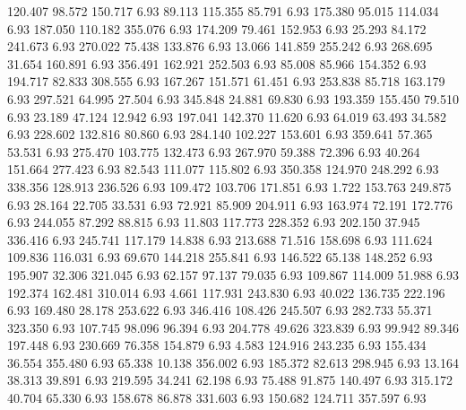  120.407   98.572  150.717         6.93
  89.113  115.355   85.791         6.93
 175.380   95.015  114.034         6.93
 187.050  110.182  355.076         6.93
 174.209   79.461  152.953         6.93
  25.293   84.172  241.673         6.93
 270.022   75.438  133.876         6.93
  13.066  141.859  255.242         6.93
 268.695   31.654  160.891         6.93
 356.491  162.921  252.503         6.93
  85.008   85.966  154.352         6.93
 194.717   82.833  308.555         6.93
 167.267  151.571   61.451         6.93
 253.838   85.718  163.179         6.93
 297.521   64.995   27.504         6.93
 345.848   24.881   69.830         6.93
 193.359  155.450   79.510         6.93
  23.189   47.124   12.942         6.93
 197.041  142.370   11.620         6.93
  64.019   63.493   34.582         6.93
 228.602  132.816   80.860         6.93
 284.140  102.227  153.601         6.93
 359.641   57.365   53.531         6.93
 275.470  103.775  132.473         6.93
 267.970   59.388   72.396         6.93
  40.264  151.664  277.423         6.93
  82.543  111.077  115.802         6.93
 350.358  124.970  248.292         6.93
 338.356  128.913  236.526         6.93
 109.472  103.706  171.851         6.93
   1.722  153.763  249.875         6.93
  28.164   22.705   33.531         6.93
  72.921   85.909  204.911         6.93
 163.974   72.191  172.776         6.93
 244.055   87.292   88.815         6.93
  11.803  117.773  228.352         6.93
 202.150   37.945  336.416         6.93
 245.741  117.179   14.838         6.93
 213.688   71.516  158.698         6.93
 111.624  109.836  116.031         6.93
  69.670  144.218  255.841         6.93
 146.522   65.138  148.252         6.93
 195.907   32.306  321.045         6.93
  62.157   97.137   79.035         6.93
 109.867  114.009   51.988         6.93
 192.374  162.481  310.014         6.93
   4.661  117.931  243.830         6.93
  40.022  136.735  222.196         6.93
 169.480   28.178  253.622         6.93
 346.416  108.426  245.507         6.93
 282.733   55.371  323.350         6.93
 107.745   98.096   96.394         6.93
 204.778   49.626  323.839         6.93
  99.942   89.346  197.448         6.93
 230.669   76.358  154.879         6.93
   4.583  124.916  243.235         6.93
 155.434   36.554  355.480         6.93
  65.338   10.138  356.002         6.93
 185.372   82.613  298.945         6.93
  13.164   38.313   39.891         6.93
 219.595   34.241   62.198         6.93
  75.488   91.875  140.497         6.93
 315.172   40.704   65.330         6.93
 158.678   86.878  331.603         6.93
 150.682  124.711  357.597         6.93
